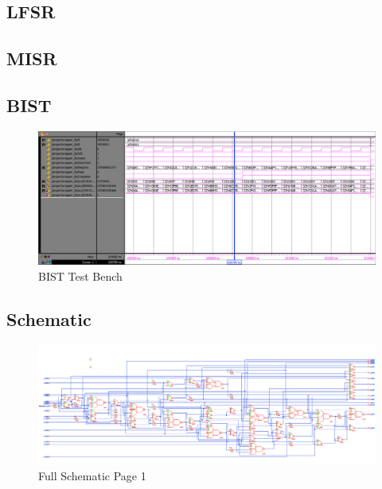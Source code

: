 \documentclass[11pt]{article}
\begin{document}
	\subsection{LFSR}
	
	\subsection{MISR}
	
	
	
	\subsection{BIST}
	\begin{figure}[H] 
		\centering 
		\includegraphics[width=\textwidth,height=\dimexpr\textheight-4\baselineskip-\abovecaptionskip-\belowcaptionskip\relax,keepaspectratio]{"Pictures/BIST-Test-Bench"}
		\caption{BIST Test Bench} 
		\label{fig:BIST-Test-Bench} 
	\end{figure}
	
	\subsection{Schematic}
	
	
		
		
		\begin{figure}[H] 
			\centering 
			\includegraphics[width=\textwidth,height=\dimexpr\textheight-4\baselineskip-\abovecaptionskip-\belowcaptionskip\relax,keepaspectratio]{"Pictures/Full Schematic Page 1"}
			\caption{Full Schematic Page 1} 
			\label{fig:Full-Schematic-Page-1} 
		\end{figure}
	
\end{document}
